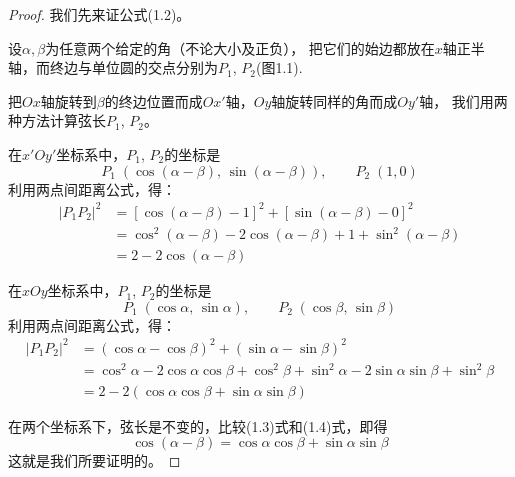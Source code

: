 \begin{proof}
我们先来证公式(1.2)。

设$\alpha,\beta$为任意两个给定的角（不论大小及正负），
把它们的始边都放在$x$轴正半轴，而终边与单位圆的交点分别为$P_1$, $P_2$(图1.1).

\begin{figure}[htp]
    \centering
    \caption{}
\end{figure}

把$Ox$轴旋转到$\beta$的终边位置而成$Ox'$轴，$Oy$轴旋转同样的角而成$Oy'$轴，
我们用两种方法计算弦长$P_1$, $P_2$。

在$x'Oy'$坐标系中，$P_1$, $P_2$的坐标是
\[P_1\; \left(\cos(\alpha-\beta),\, \sin(\alpha-\beta)\right),\qquad P_2\; (1,0) \]
利用两点间距离公式，得：
\begin{equation}
\begin{split}
|P_1P_2|^2 &=\left[\cos(\alpha-\beta)-1\right]^2+\left[\sin(\alpha-\beta)-0\right]^2\\
&=\cos^2(\alpha-\beta)-2\cos(\alpha-\beta)+1+\sin^2(\alpha-\beta)\\
&=2-2\cos (\alpha-\beta)
\end{split}
\end{equation}

在$xOy$坐标系中，$P_1$, $P_2$的坐标是
\[P_1\;(\cos\alpha,\, \sin\alpha),\qquad  P_2\; (\cos\beta,\, \sin\beta)\]
利用两点间距离公式，得：
\begin{equation}
    \begin{split}
    |P_1P_2|^2 &=(\cos\alpha-\cos\beta)^2+(\sin\alpha-\sin\beta)^2\\
    &=\cos^2\alpha-2\cos\alpha\cos\beta+\cos^2\beta +\sin^2\alpha-2\sin\alpha\sin\beta+\sin^2\beta\\
    &=2-2(\cos\alpha\cos\beta+\sin\alpha\sin\beta)
    \end{split}
    \end{equation}

    在两个坐标系下，弦长是不变的，比较(1.3)式和(1.4)式，即得
   \[ \cos (\alpha-\beta) =\cos\alpha\cos\beta+\sin\alpha\sin\beta\]
    这就是我们所要证明的。
\end{proof}

